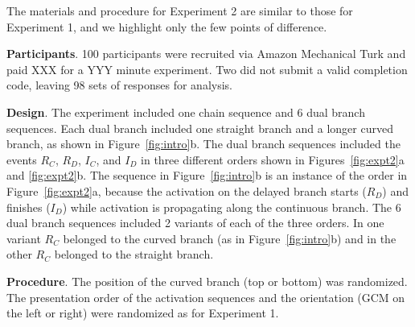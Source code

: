 \documentclass[10pt,letterpaper]{article}
\newcommand{\ev}[2]{$#1_#2$}
\begin{document}
The materials and procedure for Experiment 2 are similar to those for Experiment 1, and we highlight only the few points of difference.

\textbf{Participants}. 100 participants were recruited via Amazon Mechanical Turk and paid XXX for a YYY minute experiment. Two did not submit a valid completion code, leaving 98 sets of responses for analysis.


\textbf{Design}. 
The experiment included one chain sequence and 6 dual branch sequences. Each dual branch included one straight branch and a longer curved branch, as shown in Figure~\ref{fig:intro}b. The dual branch sequences included the events \ev{R}{C}, \ev{R}{D}, \ev{I}{C}, and \ev{I}{D} in three different orders shown in Figures~\ref{fig:expt2}a and \ref{fig:expt2}b. The sequence in Figure~\ref{fig:intro}b is an instance of the order in Figure~\ref{fig:expt2}a, because the activation on the delayed branch starts (\ev{R}{D}) and finishes (\ev{I}{D}) while activation is propagating along the continuous branch. The 6 dual branch sequences included 2 variants of each of the three orders. In one variant \ev{R}{C} belonged to the curved branch (as in Figure~\ref{fig:intro}b) and in the other \ev{R}{C} belonged to the straight branch. 



\textbf{Procedure}. 
The position of the curved branch (top or bottom) was randomized. The presentation order of the activation sequences and the orientation (GCM on the left or right) were randomized as for Experiment 1.
\end{document}
